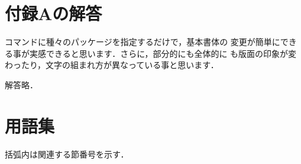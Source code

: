 \section*{付録Aの解答}
\appkaito
\begin{description}
 コマンドに種々のパッケージを指定するだけで，基本書体の
 変更が簡単にできる事が実感できると思います．さらに，部分的にも全体的に
 も版面の印象が変わったり，文字の組まれ方が異なっている事と思います．

解答略．
\end{description}

\section{用語集}

括弧内は関連する節番号を示す．

